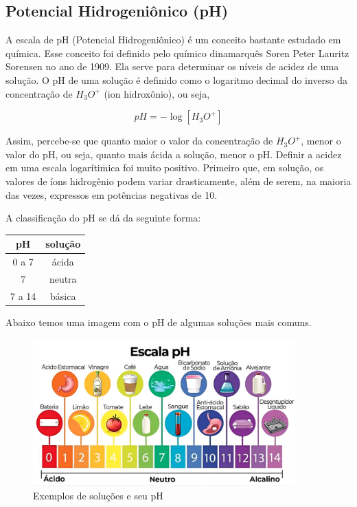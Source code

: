 \subsection{Potencial Hidrogeniônico (pH)}

A escala de pH (Potencial Hidrogeniônico) é um conceito bastante estudado em química. Esse conceito foi definido pelo químico dinamarquês Soren Peter Lauritz Sorensen no ano de 1909. Ela serve para determinar os níveis de acidez de uma solução. O pH de uma solução é definido como o logaritmo decimal do inverso da concentração de $H_3O^{+}$ (ion hidroxônio), ou seja,

\[
pH = - \log[H_3O^{+}]
\]

Assim, percebe-se que quanto maior o valor da concentração de $H_3O^{+}$, menor o valor do pH, ou seja, quanto mais ácida a solução, menor o pH. Definir a acidez em uma escala logarítimica foi muito positivo. Primeiro que, em solução, os valores de íons hidrogênio podem variar drasticamente, além de serem, na maioria das vezes, expressos em potências negativas de 10.


A classificação do pH se dá da seguinte forma:

\begin{center}
\begin{tabular}{|c|c|}
\hline
\textbf{pH} & \textbf{solução} \\
\hline
0 a 7 & ácida \\
\hline
7 & neutra \\
\hline
7 a 14 & básica \\
\hline
\end{tabular}
\end{center}

Abaixo temos uma imagem com o pH de algumas soluções mais comuns.

\begin{figure}[h]
    \centering
    \includegraphics[width=0.9\textwidth]{img/escalaph.png}
    \caption{Exemplos de soluções e seu pH}
    \label{fig:escalaph}
\end{figure}


